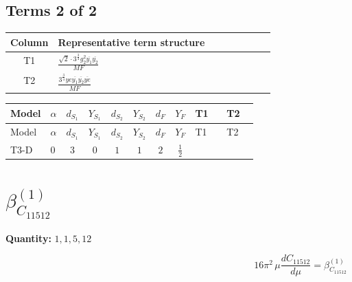 \documentclass[8pt]{article}
\begin{document}
\begin{landscape}
\subsection*{Terms 2 of 2}
\begin{center}
\begin{tabular}{@{}c >{\raggedright\arraybackslash}p{0.82\linewidth}@{}}
\toprule
Column & Representative term structure \\
\midrule
T1 & \(\displaystyle \frac{\sqrt{2} \cdot 3^{\frac{3}{4}} g_{2}^{2} \overline{y_{1}} \overline{y_{2}}}{MF}\) \\
\midrule
T2 & \(\displaystyle \frac{3^{\frac{3}{4}} ye \overline{y_{1}} \overline{y_{2}} \overline{ye}}{MF}\) \\
\midrule
\bottomrule
\end{tabular}
\end{center}
\smallskip
\tiny
\begin{longtable}{@{}llcccccc >{\raggedright\arraybackslash}p{0.21\linewidth} >{\raggedright\arraybackslash}p{0.21\linewidth}@{}}
\toprule
Model & $\alpha$ & $d_{S_1}$ & $Y_{S_1}$ & $d_{S_2}$ & $Y_{S_2}$ & $d_F$ & $Y_F$ & T1 & T2 \\
\midrule
\endfirsthead
\toprule
Model & $\alpha$ & $d_{S_1}$ & $Y_{S_1}$ & $d_{S_2}$ & $Y_{S_2}$ & $d_F$ & $Y_F$ & T1 & T2 \\
\midrule
\endhead
T3-D & $0$ & $3$ & $0$ & $1$ & $1$ & $2$ & $\frac{1}{2}$ & \scriptsize\adjustbox{max width=\linewidth}{$\begin{gathered} - \frac{\sqrt{2} \cdot 3^{\frac{3}{4}} g_{2}^{2} \overline{y_{1}} \overline{y_{2}}}{3 MF}\end{gathered}$} & \scriptsize\adjustbox{max width=\linewidth}{$\begin{gathered} \frac{3^{\frac{3}{4}} ye \overline{y_{1}} \overline{y_{2}} \overline{ye}}{12 MF}\end{gathered}$} \\
\midrule
\bottomrule
\end{longtable}
\clearpage
\section*{$\beta_{C_{11512}}^{(1)}$}
\noindent\textbf{Quantity: }$\mathrm{1,1,5,12}$\par\smallskip
\[16\pi^2\,\mu\frac{d C_{11512}}{d\mu}=\beta_{C_{11512}}^{(1)}\]

\end{landscape}
\end{document}
